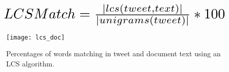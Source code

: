 \begin{equation}
\resizebox{.9\hsize}{!}{$LCSMatch = \frac{| lcs(tweet, text) |}{| unigrams(tweet) |} * 100$}
\end{equation}

\begin{figure}[htbp]
\centering
\texttt{[image: lcs\_doc]}
\caption{Percentages of words matching in tweet and document text using an LCS algorithm.}
\label{fig:lcs}
\end{figure}



